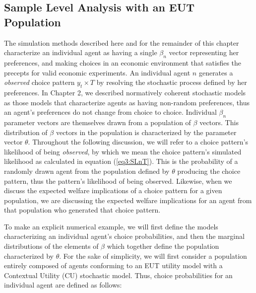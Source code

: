 \documentclass[../main.tex]{subfiles}
\begin{document}
\subsection{Sample Level Analysis with an EUT Population}

The simulation methods described here and for the remainder of this chapter characterize an individual agent as having a single $\beta_n$ vector representing her preferences, and making choices in an economic environment that satisfies the \textcite{Smith1982} precepts for valid economic experiments.
An individual agent $n$ generates a \textit{observed} choice pattern $y_t \times T$ by resolving the stochastic process defined by her preferences.
In Chapter 2, we described normatively coherent stochastic models as those models that characterize agents as having non-random preferences, thus an agent's preferences do not change from choice to choice.{\footnotemark}
Individual $\beta_n$ parameter vectors are themselves drawn from a population of $\beta$ vectors. 
This distribution of $\beta$ vectors in the population is characterized by the parameter vector $\theta$.
Throughout the following discussion, we will refer to a choice pattern's likelihood of being \textit{observed}, by which we mean the choice pattern's simulated likelihood as calculated in equation (\ref{eq3:SLnT}).
This is the probability of a randomly drawn agent from the population defined by $\theta$ producing the choice pattern, thus the pattern's likelihood of being observed.
Likewise, when we discuss the expected welfare implications of a choice pattern for a given population, we are discussing the expected welfare implications for an agent from that population who generated that choice pattern.

To make an explicit numerical example, we will first define the models characterizing an individual agent's choice probabilities, and then the marginal distributions of the elements of $\beta$ which together define the population characterized by $\theta$.
For the sake of simplicity, we will first consider a population entirely composed of agents conforming to an EUT utility model with a Contextual Utility (CU) stochastic model.
Thus, choice probabilities for an individual agent are defined as follows:

\addtocounter{footnote}{-1}
\end{document}
